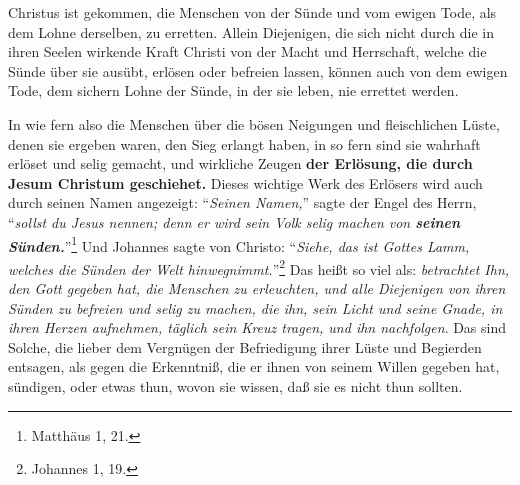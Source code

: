 \medskip

Christus ist gekommen, die Menschen von der Sünde und vom ewigen Tode, als dem
Lohne derselben, zu erretten.
Allein Diejenigen, die sich nicht durch die in ihren Seelen wirkende Kraft
Christi von der Macht und Herrschaft, welche die Sünde über sie ausübt, erlösen
oder befreien lassen, können auch von dem ewigen Tode, dem sichern Lohne der
Sünde, in der sie leben, nie errettet werden.

\medskip 

In wie fern also die Menschen über die bösen Neigungen und fleischlichen Lüste,
denen sie ergeben waren, den Sieg erlangt haben, in so fern sind sie wahrhaft
erlöset und selig gemacht, und wirkliche Zeugen \textbf{der Erlösung, die durch
Jesum Christum geschiehet.}
Dieses wichtige Werk des Erlösers wird auch durch seinen Namen angezeigt:
"`\textit{Seinen Namen,}"' sagte der Engel des Herrn, "`\textit{sollst du Jesus
nennen; denn er wird sein Volk selig machen von \textbf{seinen
Sünden.}}"'\footnote{Matthäus 1, 21.} 
Und Johannes sagte von Christo: "`\textit{Siehe, das ist Gottes Lamm, welches
die Sünden der Welt hinwegnimmt.}"'\footnote{Johannes 1, 19.}
Das heißt so viel als:
\textit{betrachtet Ihn, den Gott gegeben hat, die Menschen zu erleuchten, und
alle Diejenigen von ihren Sünden zu befreien und selig zu machen, die ihn, sein
Licht und seine Gnade, in ihren Herzen aufnehmen, täglich sein Kreuz tragen, und
ihn nachfolgen}.
Das sind Solche, die lieber dem Vergnügen der Befriedigung ihrer Lüste und
Begierden entsagen, als gegen die Erkenntniß, die er ihnen von seinem Willen
gegeben hat, sündigen, oder etwas thun, wovon sie wissen, daß sie es nicht thun
sollten.




